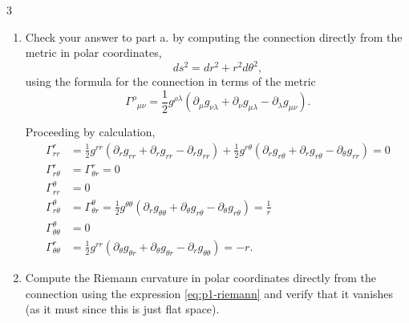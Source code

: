 \documentclass[11pt]{article}
\begin{document}
\begin{problem}{3}
\begin{enumerate}[label=(\alph*)]
\begin{answer}
          \end{answer}
		\item Check your answer to part a. by computing the connection directly from the metric in polar coordinates,
		      \begin{equation}
			      \label{eq:p3-polar-metric}
			      ds^2=dr^2+r^2d\theta^2,
		      \end{equation}
		      using the formula for the connection in terms of the metric
		      \begin{equation}
			      \label{eq:p3-levi-civita-connection}
			      \Gamma^\rho{}_{\mu\nu}
			      =\frac12 g^{\rho\lambda}(\partial_\mu g_{\nu\lambda}+\partial_\nu g_{\mu\lambda}-\partial_\lambda g_{\mu\nu}).
		      \end{equation}
		      \begin{answer}
			      Proceeding by calculation,
			      \begin{equation}
				      \label{eq:1}
				      \begin{aligned}
					      \Gamma_{rr}^r &= \frac{1}{2}g^{rr} \left( \partial_rg_{rr} + \partial_rg_{rr} - \partial_rg_{rr} \right) + \frac{1}{2}g^{r\theta} \left( \partial_rg_{r\theta} + \partial_rg_{r\theta} - \partial_{\theta}g_{rr} \right) = 0 \\
                \Gamma_{r\theta}^r &= \Gamma_{\theta r}^r = 0 \\
                \Gamma_{rr}^{\theta} &= 0 \\
                \Gamma_{r\theta}^{\theta} &= \Gamma_{\theta r}^{\theta} = \frac{1}{2}g^{\theta\theta} \left( \partial_rg_{\theta\theta} + \partial_{\theta}g_{r\theta} - \partial_{\theta}g_{r\theta} \right) = \frac{1}{r} \\
                \Gamma _{\theta\theta}^{\theta} &= 0 \\
                \Gamma_{\theta\theta}^r &= \frac{1}{2}g^{rr} \left( \partial_{\theta}g_{\theta r} + \partial_{\theta}g_{\theta r} - \partial_rg_{\theta\theta} \right) = -r.
				      \end{aligned}
			      \end{equation}
		      \end{answer}
		\item Compute the Riemann curvature in polar coordinates directly from the connection using the expression \cref{eq:p1-riemann} and verify that it vanishes (as it must since this is just flat space).
          \begin{answer}


\end{answer}
\end{enumerate}
\end{problem}
\end{document}
